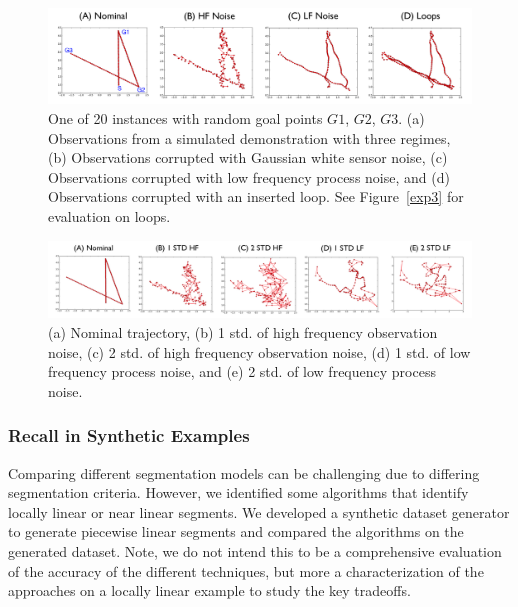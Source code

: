 \begin{figure}%
\centering
\includegraphics[width=\textwidth]{tsc-experiments/tsc_segmentation_benchmark.png}
\caption{One of 20 instances with random goal points $G1$, $G2$, $G3$. (a) Observations from a simulated demonstration with three regimes, (b) Observations corrupted with Gaussian white sensor noise, (c) Observations corrupted with low frequency process noise, and (d) Observations corrupted with an inserted loop. See Figure~\ref{exp3} for evaluation on loops. \label{simulated}}
\end{figure}

\begin{figure}%
\centering
\includegraphics[width=\textwidth]{tsc-experiments/noise_illustration.png}
\caption{(a) Nominal trajectory, (b) 1 std. of high frequency observation noise, (c) 2 std. of high frequency observation noise,  (d) 1 std. of low frequency process noise, and (e) 2 std. of low frequency process noise. \label{simulated-noise}}
\end{figure}

\subsubsection{Recall in Synthetic Examples}
Comparing different segmentation models can be challenging due to differing segmentation criteria. However, we identified some algorithms that identify locally linear or near linear segments.
We developed a synthetic dataset generator to generate piecewise linear segments and compared the algorithms on the generated dataset.
Note, we do not intend this to be a comprehensive evaluation of the accuracy of the different techniques, but more a characterization of the approaches on a locally linear example to study the key tradeoffs.

